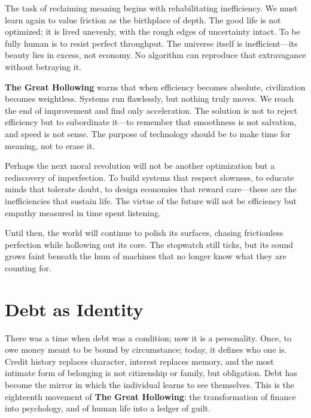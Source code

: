 \documentclass[11pt,twoside]{book}
\begin{document}
The task of reclaiming meaning begins with rehabilitating inefficiency.  We must learn again to value friction as the birthplace of depth.  The good life is not optimized; it is lived unevenly, with the rough edges of uncertainty intact.  To be fully human is to resist perfect throughput.  The universe itself is inefficient—its beauty lies in excess, not economy.  No algorithm can reproduce that extravagance without betraying it.

\textbf{The Great Hollowing} warns that when efficiency becomes absolute, civilization becomes weightless.  Systems run flawlessly, but nothing truly moves.  We reach the end of improvement and find only acceleration.  The solution is not to reject efficiency but to subordinate it—to remember that smoothness is not salvation, and speed is not sense.  The purpose of technology should be to make time for meaning, not to erase it.

Perhaps the next moral revolution will not be another optimization but a rediscovery of imperfection.  To build systems that respect slowness, to educate minds that tolerate doubt, to design economies that reward care—these are the inefficiencies that sustain life.  The virtue of the future will not be efficiency but empathy measured in time spent listening.

Until then, the world will continue to polish its surfaces, chasing frictionless perfection while hollowing out its core.  The stopwatch still ticks, but its sound grows faint beneath the hum of machines that no longer know what they are counting for.

%
\chapter{Debt as Identity}
\label{ch:20.1}

There was a time when debt was a condition; now it is a personality.  
Once, to owe money meant to be bound by circumstance; today, it defines who one is.  Credit history replaces character, interest replaces memory, and the most intimate form of belonging is not citizenship or family, but obligation.  Debt has become the mirror in which the individual learns to see themselves.  This is the eighteenth movement of \textbf{The Great Hollowing}: the transformation of finance into psychology, and of human life into a ledger of guilt.
\end{document}

